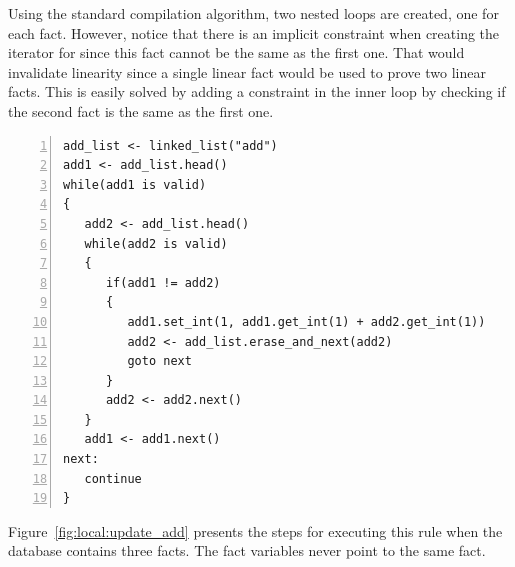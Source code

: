 Using the standard compilation algorithm, two nested loops are created, one for
each  fact. However, notice that there is an implicit constraint when
creating the iterator for  since this fact cannot be the same
as the first one. That would invalidate linearity since a single linear fact
would be used to prove two linear facts. This is easily solved by adding a
constraint in the inner loop by checking if the second fact is the same as the
first one.

\begin{Verbatim}[numbers=left,fontsize=\codesize]
add_list <- linked_list("add")
add1 <- add_list.head()
while(add1 is valid)
{
   add2 <- add_list.head()
   while(add2 is valid)
   {
      if(add1 != add2)
      {
         add1.set_int(1, add1.get_int(1) + add2.get_int(1))
         add2 <- add_list.erase_and_next(add2)
         goto next
      }
      add2 <- add2.next()
   }
   add1 <- add1.next()
next:
   continue
}
\end{Verbatim}

Figure~\ref{fig:local:update_add} presents the steps for executing this rule
when the database contains three facts. The fact variables never point to the
same fact.

